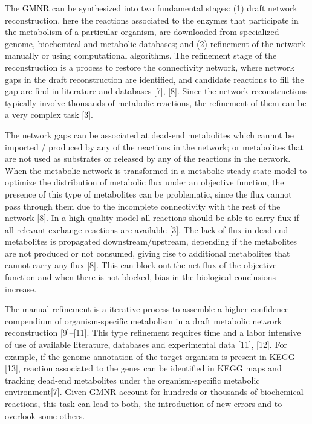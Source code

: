 The GMNR can be synthesized into two fundamental stages: (1) draft network reconstruction, here the reactions associated to the enzymes that participate in the metabolism of a particular organism, are downloaded from specialized genome, biochemical and metabolic databases; and (2) refinement of the network manually or using computational algorithms. The refinement stage of the reconstruction is a process to restore the connectivity network, where network gaps in the draft reconstruction are identified, and candidate reactions to fill the gap are find in literature and databases [7], [8]. Since the network reconstructions typically involve thousands of metabolic reactions, the refinement of them can be a very complex task [3].

The network gaps can be associated at dead-end metabolites which cannot be imported / produced by any of the reactions in the network; or metabolites that are not used as substrates or released by any of the reactions in the network. When the metabolic network is transformed in a metabolic steady-state model to optimize the distribution of metabolic flux under an objective function, the presence of this type of metabolites can be problematic, since the flux cannot pass through them due to the incomplete connectivity with the rest of the network [8].  In a high quality model all reactions should be able to carry flux if all relevant exchange reactions are available [3]. The lack of flux in dead-end metabolites is propagated downstream/upstream, depending if the metabolites are not produced or not consumed, giving rise to additional metabolites that cannot carry any flux [8]. This can block out the net flux of the objective function and when there is not blocked, bias in the biological conclusions increase. 

The manual refinement is a iterative process to assemble a higher confidence compendium of organism-specific metabolism in a draft metabolic network reconstruction [9]–[11]. This type refinement requires time and a labor intensive of use of available literature, databases and experimental data [11], [12]. For example, if the genome annotation of the target organism is present in KEGG [13], reaction associated to the genes can be identified in KEGG maps and tracking dead-end metabolites under the organism-specific metabolic environment[7]. Given GMNR account for hundreds or thousands of biochemical reactions, this task can lead to both, the introduction of new errors and to overlook some others. 

